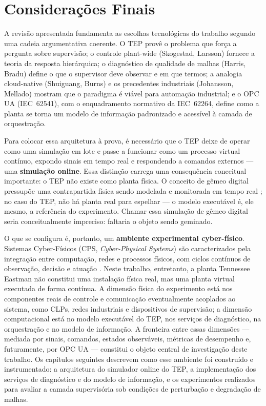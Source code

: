 
\section{Considerações Finais}
\label{sec:ref_conclusao}

A revisão apresentada fundamenta as escolhas tecnológicas do trabalho segundo uma cadeia argumentativa coerente. O TEP provê o problema que força a pergunta sobre supervisão; o controle plant-wide (Skogestad, Larsson) fornece a teoria da resposta hierárquica; o diagnóstico de qualidade de malhas (Harris, Bradu) define o que o supervisor deve observar e em que termos; a analogia cloud-native (Shuiguang, Burns) e os precedentes industriais (Johansson, Mellado) mostram que o paradigma é viável para automação industrial; e o OPC UA (IEC~62541), com o enquadramento normativo da IEC~62264, define como a planta se torna um modelo de informação padronizado e acessível à camada de orquestração.

Para colocar essa arquitetura à prova, é necessário que o TEP deixe de operar como uma simulação em lote e passe a funcionar como um processo virtual contínuo, expondo sinais em tempo real e respondendo a comandos externos --- uma \textbf{simulação online}. Essa distinção carrega uma consequência conceitual importante: o TEP não existe como planta física. O conceito de gêmeo digital pressupõe uma contrapartida física sendo modelada e monitorada em tempo real \cite{Boschert2016}; no caso do TEP, não há planta real para espelhar --- o modelo executável é, ele mesmo, a referência do experimento. Chamar essa simulação de gêmeo digital seria conceitualmente impreciso: faltaria o objeto sendo geminado.

O que se configura é, portanto, um \textbf{ambiente experimental cyber-físico}. Sistemas Cyber-Físicos (CPS, \textit{Cyber-Physical Systems}) são caracterizados pela integração entre computação, redes e processos físicos, com ciclos contínuos de observação, decisão e atuação \cite{Hehenberger2016}. Neste trabalho, entretanto, a planta Tennessee Eastman não constitui uma instalação física real, mas uma planta virtual executada de forma contínua. A dimensão física do experimento está nos componentes reais de controle e comunicação eventualmente acoplados ao sistema, como CLPs, redes industriais e dispositivos de supervisão; a dimensão computacional está no modelo executável do TEP, nos serviços de diagnóstico, na orquestração e no modelo de informação. A fronteira entre essas dimensões --- mediada por sinais, comandos, estados observáveis, métricas de desempenho e, futuramente, por OPC UA --- constitui o objeto central de investigação deste trabalho.
Os capítulos seguintes descrevem como esse ambiente foi construído e instrumentado: a arquitetura do simulador online do TEP, a implementação dos serviços de diagnóstico e do modelo de informação, e os experimentos realizados para avaliar a camada supervisória sob condições de perturbação e degradação de malhas.

